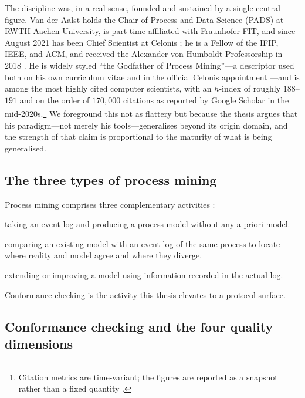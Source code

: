 The discipline was, in a real sense, founded and sustained by a single central
figure. Van der Aalst holds the Chair of Process and Data Science (PADS) at RWTH
Aachen University, is part-time affiliated with Fraunhofer FIT, and since August
2021 has been Chief Scientist at Celonis \citep{vdaalst-cv,celonis-godfather}; he
is a Fellow of the IFIP, IEEE, and ACM, and received the Alexander von Humboldt
Professorship in 2018 \citep{vdaalst-cv}. He is widely styled ``the Godfather of
Process Mining''---a descriptor used both on his own curriculum vitae and in the
official Celonis appointment \citep{vdaalst-cv,celonis-godfather}---and is among
the most highly cited computer scientists, with an $h$-index of roughly
$188$--$191$ and on the order of $170{,}000$ citations as reported by Google
Scholar in the mid-2020s.\footnote{Citation metrics are time-variant; the figures
are reported as a snapshot rather than a fixed quantity \citep{vdaalst-cv}.} We
foreground this not as flattery but because the thesis argues that his
paradigm---not merely his tools---generalises beyond its origin domain, and the
strength of that claim is proportional to the maturity of what is being
generalised.

\subsection{The three types of process mining}

Process mining comprises three complementary activities
\citep{pm-manifesto-2011,vdaalst-book-2016}:

\begin{description}[leftmargin=1.4em,style=nextline]
  \item[Discovery] taking an event log and producing a process model without any
  a-priori model.
  \item[Conformance checking] comparing an existing model with an event log of
  the same process to locate where reality and model agree and where they
  diverge.
  \item[Enhancement] extending or improving a model using information recorded in
  the actual log.
\end{description}

Conformance checking is the activity this thesis elevates to a protocol surface.

\subsection{Conformance checking and the four quality dimensions}
\label{sec:bg-conformance}

